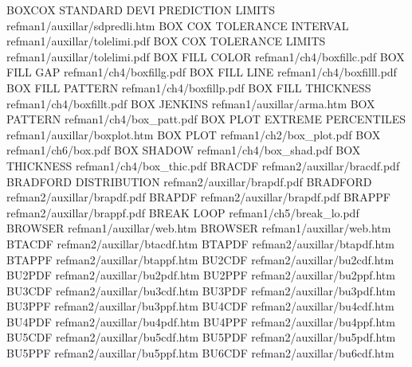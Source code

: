 BOXCOX STANDARD DEVI PREDICTION LIMITS  refman1/auxillar/sdpredli.htm
BOX COX TOLERANCE INTERVAL              refman1/auxillar/tolelimi.pdf
BOX COX TOLERANCE LIMITS                refman1/auxillar/tolelimi.pdf
BOX FILL COLOR                          refman1/ch4/boxfillc.pdf
BOX FILL GAP                            refman1/ch4/boxfillg.pdf
BOX FILL LINE                           refman1/ch4/boxfilll.pdf
BOX FILL PATTERN                        refman1/ch4/boxfillp.pdf
BOX FILL THICKNESS                      refman1/ch4/boxfillt.pdf
BOX JENKINS                             refman1/auxillar/arma.htm
BOX PATTERN                             refman1/ch4/box_patt.pdf
BOX PLOT EXTREME PERCENTILES            refman1/auxillar/boxplot.htm
BOX PLOT                                refman1/ch2/box_plot.pdf
BOX                                     refman1/ch6/box.pdf
BOX SHADOW                              refman1/ch4/box_shad.pdf
BOX THICKNESS                           refman1/ch4/box_thic.pdf
BRACDF                                  refman2/auxillar/bracdf.pdf
BRADFORD DISTRIBUTION                   refman2/auxillar/brapdf.pdf
BRADFORD                                refman2/auxillar/brapdf.pdf
BRAPDF                                  refman2/auxillar/brapdf.pdf
BRAPPF                                  refman2/auxillar/brappf.pdf
BREAK LOOP                              refman1/ch5/break_lo.pdf
BROWSER                                 refman1/auxillar/web.htm
BROWSER                                 refman1/auxillar/web.htm
BTACDF                                  refman2/auxillar/btacdf.htm
BTAPDF                                  refman2/auxillar/btapdf.htm
BTAPPF                                  refman2/auxillar/btappf.htm
BU2CDF                                  refman2/auxillar/bu2cdf.htm
BU2PDF                                  refman2/auxillar/bu2pdf.htm
BU2PPF                                  refman2/auxillar/bu2ppf.htm
BU3CDF                                  refman2/auxillar/bu3cdf.htm
BU3PDF                                  refman2/auxillar/bu3pdf.htm
BU3PPF                                  refman2/auxillar/bu3ppf.htm
BU4CDF                                  refman2/auxillar/bu4cdf.htm
BU4PDF                                  refman2/auxillar/bu4pdf.htm
BU4PPF                                  refman2/auxillar/bu4ppf.htm
BU5CDF                                  refman2/auxillar/bu5cdf.htm
BU5PDF                                  refman2/auxillar/bu5pdf.htm
BU5PPF                                  refman2/auxillar/bu5ppf.htm
BU6CDF                                  refman2/auxillar/bu6cdf.htm
